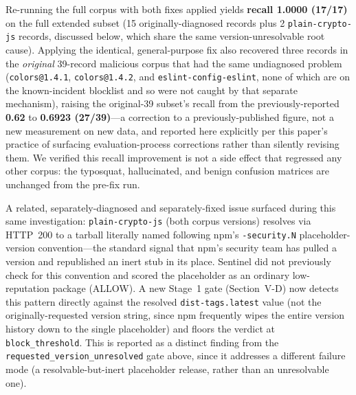 \documentclass[journal]{IEEEtran}
\begin{document}
Re-running the full corpus with both fixes applied yields \textbf{recall 1.0000 (17/17)} on the full extended
subset (15 originally-diagnosed records plus 2 \texttt{plain-crypto-js} records, discussed below, which share
the same version-unresolvable root cause). Applying the identical, general-purpose fix also recovered three
records in the \emph{original} 39-record malicious corpus that had the same undiagnosed problem
(\texttt{colors@1.4.1}, \texttt{colors@1.4.2}, and \texttt{eslint-config-eslint}, none of which are on the
known-incident blocklist and so were not caught by that separate mechanism), raising the original-39 subset's
recall from the previously-reported \textbf{0.62} to \textbf{0.6923 (27/39)}---a correction to a
previously-published figure, not a new measurement on new data, and reported here explicitly per this
paper's practice of surfacing evaluation-process corrections rather than silently revising them. We verified
this recall improvement is not a side effect that regressed any other corpus: the typosquat, hallucinated,
and benign confusion matrices are unchanged from the pre-fix run.

A related, separately-diagnosed and separately-fixed issue surfaced during this same investigation:
\texttt{plain-crypto-js} (both corpus versions) resolves via HTTP~200 to a tarball literally named following
npm's \texttt{-security.N} placeholder-version convention---the standard signal that npm's security team has
pulled a version and republished an inert stub in its place. Sentinel did not previously check for this
convention and scored the placeholder as an ordinary low-reputation package (ALLOW). A new Stage~1 gate
(Section~V-D) now detects this pattern directly against the resolved \texttt{dist-tags.latest} value (not the
originally-requested version string, since npm frequently wipes the entire version history down to the
single placeholder) and floors the verdict at \texttt{block\_threshold}. This is reported as a distinct
finding from the \texttt{requested\_version\_unresolved} gate above, since it addresses a different failure
mode (a resolvable-but-inert placeholder release, rather than an unresolvable one).
\end{document}
